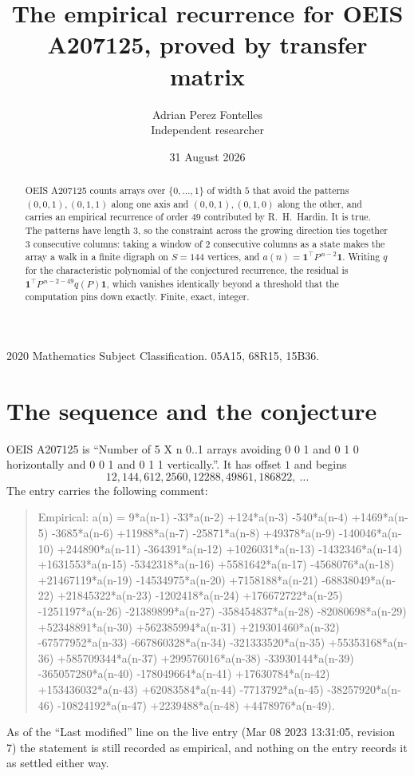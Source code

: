 \documentclass[11pt,a4paper]{article}
\title{The empirical recurrence for OEIS A207125, proved by transfer matrix}
\author{Adrian Perez Fontelles\\ \small Independent researcher}
\date{31 August 2026}
\theoremstyle{plain}
\theoremstyle{definition}
\begin{document}
\maketitle

\begin{abstract}
OEIS A207125 counts arrays over $\{0,\dots,1\}$ of width $5$ that avoid the patterns
$(0,0,1), (0,1,1)$ along one axis and $(0,0,1), (0,1,0)$ along the other, and carries an empirical recurrence of
order $49$ contributed by R.~H.~Hardin. It is true. The patterns have length $3$, so
the constraint across the growing direction ties together $3$ consecutive columns: taking a
window of $2$ consecutive columns as a state makes the array a walk in a finite digraph
on $S=144$ vertices, and $a(n)=\mathbf{1}^{\!\top}P^{\,n-2}\mathbf{1}$. Writing $q$
for the characteristic polynomial of the conjectured recurrence, the residual is
$\mathbf{1}^{\!\top}P^{\,n-2-49}q(P)\mathbf{1}$, which vanishes identically
beyond a threshold that the computation pins down exactly. Finite, exact, integer.
\end{abstract}

\noindent\small 2020 Mathematics Subject Classification. 05A15, 68R15, 15B36.\normalsize

\section{The sequence and the conjecture}

OEIS A207125 is ``Number of 5 X n 0..1 arrays avoiding 0 0 1 and 0 1 0 horizontally and 0 0 1 and 0 1 1 vertically.''. It has offset
$1$ and begins
\[
12, 144, 612, 2560, 12288, 49861, 186822,\ \dots
\]
The entry carries the following comment:
\begin{quote}\small
Empirical: a(n) = 9*a(n-1) -33*a(n-2) +124*a(n-3) -540*a(n-4) +1469*a(n-5) -3685*a(n-6) +11988*a(n-7) -25871*a(n-8) +49378*a(n-9) -140046*a(n-10) +244890*a(n-11) -364391*a(n-12) +1026031*a(n-13) -1432346*a(n-14) +1631553*a(n-15) -5342318*a(n-16) +5581642*a(n-17) -4568076*a(n-18) +21467119*a(n-19) -14534975*a(n-20) +7158188*a(n-21) -68838049*a(n-22) +21845322*a(n-23) -1202418*a(n-24) +176672722*a(n-25) -1251197*a(n-26) -21389899*a(n-27) -358454837*a(n-28) -82080698*a(n-29) +52348891*a(n-30) +562385994*a(n-31) +219301460*a(n-32) -67577952*a(n-33) -667860328*a(n-34) -321333520*a(n-35) +55353168*a(n-36) +585709344*a(n-37) +299576016*a(n-38) -33930144*a(n-39) -365057280*a(n-40) -178049664*a(n-41) +17630784*a(n-42) +153436032*a(n-43) +62083584*a(n-44) -7713792*a(n-45) -38257920*a(n-46) -10824192*a(n-47) +2239488*a(n-48) +4478976*a(n-49).
\end{quote}
As of the ``Last modified'' line on the live entry (Mar 08 2023 13:31:05, revision
7) the statement is still recorded as empirical, and nothing on the entry
records it as settled either way.
\end{document}
